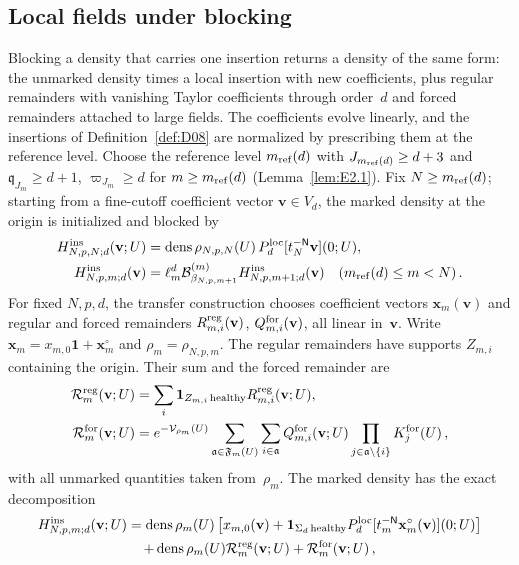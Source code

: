 \subsection{Local fields under blocking}\label{sec:marked}

Blocking a density that carries one insertion returns a density of the same form: the unmarked density times a local insertion with new coefficients, plus regular remainders with vanishing Taylor coefficients through order~$d$ and forced remainders attached to large fields. The coefficients evolve linearly, and the insertions of Definition~\ref{def:D08} are normalized by prescribing them at the reference level. Choose the reference level $m_{\mathrm{ref}}(d)$ with $J_{m_{\mathrm{ref}}(d)}\ge d+3$ and $\mathfrak q_{J_m}\ge d+1$, $\varpi_{J_m}\ge d$ for $m\ge m_{\mathrm{ref}}(d)$ (Lemma~\ref{lem:E2.1}). Fix $N\ge m_{\mathrm{ref}}(d)$; starting from a fine-cutoff coefficient vector $\mathbf v\in V_d$, the marked density at the origin is initialized and blocked by
\begin{align}\label{eq:I12-marked-evolution}
H^{\rm ins}_{N,p,N;d}(\mathbf v;U)
&=\operatorname{dens}\rho_{N,p,N}(U)\,
P_{d}^{\mathrm{loc}}[t_N^{-\mathsf{N}}\mathbf v](0;U),\\
H^{\rm ins}_{N,p,m;d}(\mathbf v)
&=\ell_m^d\mathcal{B}^{(m)}_{\beta_{N,p,m+1}}
H^{\rm ins}_{N,p,m+1;d}(\mathbf v)
\quad(m_{\mathrm{ref}}(d)\le m<N)\,.
\end{align}
For fixed $N,p,d$, the transfer construction chooses coefficient vectors $\mathbf x_m(\mathbf v)$ and regular and forced remainders $R_{m,i}^{\rm reg}(\mathbf v)$, $Q_{m,i}^{\rm for}(\mathbf v)$, all linear in~$\mathbf v$. Write $\mathbf x_m=x_{m,0}\mathbf1+\mathbf x_m^\circ$ and $\rho_m=\rho_{N,p,m}$. The regular remainders have supports $Z_{m,i}$ containing the origin. Their sum and the forced remainder are
\begin{align}\label{eq:I12-marked-remainders}
\mathcal R_m^{\rm reg}(\mathbf v;U)
&=\sum_i\mathbf1_{Z_{m,i}\,\mathrm{healthy}}R_{m,i}^{\rm reg}(\mathbf v;U),\notag\\
\mathcal R_m^{\rm for}(\mathbf v;U)
&=e^{-\mathcal V_{\rho_m}(U)}\sum_{\mathfrak a\in\mathfrak F_m(U)}\sum_{i\in\mathfrak a}
Q_{m,i}^{\rm for}(\mathbf v;U)\prod_{j\in\mathfrak a\setminus\{i\}}K_j^{\rm for}(U)\,,
\end{align}
with all unmarked quantities taken from~$\rho_m$. The marked density has the exact decomposition
\begin{multline}\label{eq:I12-marked-representation}
H^{\rm ins}_{N,p,m;d}(\mathbf v;U)=\operatorname{dens}\rho_m(U)\left[
x_{m,0}(\mathbf v)+\mathbf1_{\Sigma_d\,\mathrm{healthy}}
P_{d}^{\mathrm{loc}}[t_m^{-\mathsf{N}}\mathbf x_m^\circ(\mathbf v)](0;U)\right]\\
+\operatorname{dens}\rho_m(U)\mathcal R_m^{\rm reg}(\mathbf v;U)
+\mathcal R_m^{\rm for}(\mathbf v;U)\,,
\end{multline}
